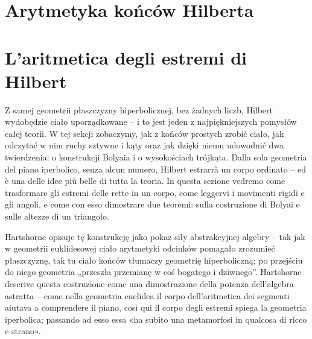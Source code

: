 
\section{Arytmetyka końców Hilberta} %
\section{L'aritmetica degli estremi di Hilbert} %
\label{sekcja_ciala_koncow}

Z samej geometrii płaszczyzny hiperbolicznej, bez żadnych liczb, Hilbert wydobędzie ciało uporządkowane -- i to jest jeden z najpiękniejszych pomysłów całej teorii. %
W tej sekcji zobaczymy, jak z końców prostych zrobić ciało, jak odczytać w nim ruchy sztywne i kąty oraz jak dzięki niemu udowodnić dwa twierdzenia: o konstrukcji Bolyaia i o wysokościach trójkąta. %
Dalla sola geometria del piano iperbolico, senza alcun numero, Hilbert estrarrà un corpo ordinato -- ed è una delle idee più belle di tutta la teoria. %
In questa sezione vedremo come trasformare gli estremi delle rette in un corpo, come leggervi i movimenti rigidi e gli angoli, e come con esso dimostrare due teoremi: sulla costruzione di Bolyai e sulle altezze di un triangolo. %

Hartshorne \cite[s. 388]{hartshorne_2000} opisuje tę konstrukcję jako pokaz siły abstrakcyjnej algebry -- tak jak w geometrii euklidesowej ciało arytmetyki odcinków pomagało zrozumieć płaszczyznę, tak tu ciało końców tłumaczy geometrię hiperboliczną; po przejściu do niego geometria „przeszła przemianę w coś bogatego i dziwnego''. %
Hartshorne \cite[p. 388]{hartshorne_2000} descrive questa costruzione come una dimostrazione della potenza dell'algebra astratta -- come nella geometria euclidea il corpo dell'aritmetica dei segmenti aiutava a comprendere il piano, così qui il corpo degli estremi spiega la geometria iperbolica; passando ad esso essa «ha subito una metamorfosi in qualcosa di ricco e strano». %

